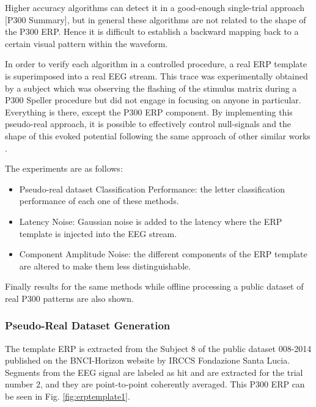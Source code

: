 \documentclass[sensors,article,submit,moreauthors,pdftex,10pt,a4paper]{mdpi}
\begin{document}
Higher accuracy algorithms can detect it in a good-enough single-trial approach [P300 Summary], but in general these algorithms are not related to the shape of the P300 ERP. Hence it is difficult to establish a backward mapping back to a certain visual pattern within the waveform.

In order to verify each algorithm in a controlled procedure, a real ERP template is superimposed into a real EEG stream.  This trace was experimentally obtained by a subject which was observing the flashing of the stimulus matrix during a P300 Speller procedure but did not engage in focusing on anyone in particular. Everything is there, except the P300 ERP component. By implementing this pseudo-real approach, it is possible to effectively control null-signals and the shape of this evoked potential following the same approach of other similar works \citep{Ouyang2017,Jaskowski2000,QuianQuiroga2003}.

The experiments are as follows:

\begin{itemize}
\item Pseudo-real dataset Classification Performance: the letter classification performance of each one of these methods.
\item Latency Noise: Gaussian noise is added to the latency where the ERP template is injected into the EEG stream.
\item Component Amplitude Noise: the different components of the ERP template are altered to make them less distinguishable.
\end{itemize}

Finally results for the same methods while offline processing a public dataset of real P300 patterns are also shown.

\subsubsection{Pseudo-Real Dataset Generation}

The template ERP is extracted from the Subject $8$ of the public dataset 008-2014  \citep{Riccio2013} published on the BNCI-Horizon website \citep{Brunner2014} by IRCCS Fondazione Santa Lucia. Segments from the EEG signal are labeled as hit and are extracted for the trial number $2$, and they are point-to-point coherently averaged.  This P300 ERP can be seen in Fig.  \ref{fig:erptemplate1}. 
\end{document}
